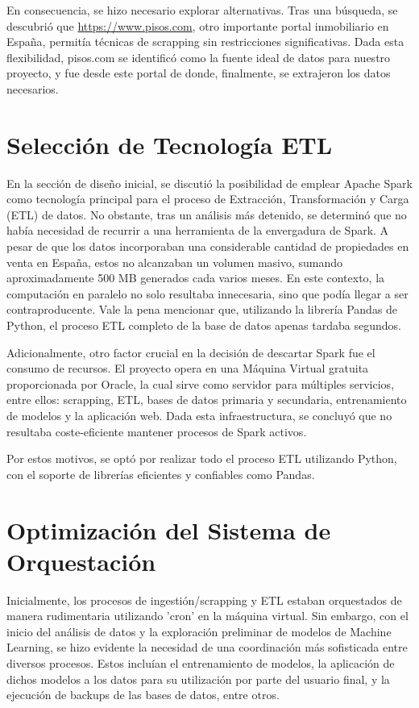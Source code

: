 En consecuencia, se hizo necesario explorar alternativas. Tras una búsqueda, se descubrió que \url{https://www.pisos.com}, otro importante portal inmobiliario en España, permitía técnicas de scrapping sin restricciones significativas. Dada esta flexibilidad, pisos.com se identificó como la fuente ideal de datos para nuestro proyecto, y fue desde este portal de donde, finalmente, se extrajeron los datos necesarios.


\section{Selección de Tecnología ETL}

En la sección de diseño inicial, se discutió la posibilidad de emplear Apache Spark como tecnología principal para el proceso de Extracción, Transformación y Carga (ETL) de datos. No obstante, tras un análisis más detenido, se determinó que no había necesidad de recurrir a una herramienta de la envergadura de Spark. A pesar de que los datos incorporaban una considerable cantidad de propiedades en venta en España, estos no alcanzaban un volumen masivo, sumando aproximadamente 500 MB generados cada varios meses. En este contexto, la computación en paralelo no solo resultaba innecesaria, sino que podía llegar a ser contraproducente. Vale la pena mencionar que, utilizando la librería Pandas de Python, el proceso ETL completo de la base de datos apenas tardaba segundos.

Adicionalmente, otro factor crucial en la decisión de descartar Spark fue el consumo de recursos. El proyecto opera en una Máquina Virtual gratuita proporcionada por Oracle, la cual sirve como servidor para múltiples servicios, entre ellos: scrapping, ETL, bases de datos primaria y secundaria, entrenamiento de modelos y la aplicación web. Dada esta infraestructura, se concluyó que no resultaba coste-eficiente mantener procesos de Spark activos.

Por estos motivos, se optó por realizar todo el proceso ETL utilizando Python, con el soporte de librerías eficientes y confiables como Pandas.

\section{Optimización del Sistema de Orquestación}

Inicialmente, los procesos de ingestión/scrapping y ETL estaban orquestados de manera rudimentaria utilizando 'cron' en la máquina virtual. Sin embargo, con el inicio del análisis de datos y la exploración preliminar de modelos de Machine Learning, se hizo evidente la necesidad de una coordinación más sofisticada entre diversos procesos. Estos incluían el entrenamiento de modelos, la aplicación de dichos modelos a los datos para su utilización por parte del usuario final, y la ejecución de backups de las bases de datos, entre otros.

